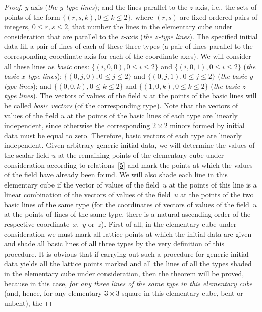 \begin{proof}
$y$-axis ({\it the $y$-type lines}); and the lines parallel to the
$z$-axis, i.e., the sets of points of the form $\{(r, s, k), 0 \leq
k \leq 2\}$, where $(r, s)$ are f\/ixed ordered pairs of integers, $0
\leq r, s \leq 2$, that number the lines in the elementary cube
under consideration that are parallel to the $z$-axis ({\it the
$z$-type lines}). The specif\/ied initial data f\/ill a pair of lines of
each of these three types (a pair of lines parallel to the
corresponding coordinate axis for each of the coordinate axes). We
will consider all these lines as {\it basic} ones: $\{(i, 0, 0), 0
\leq i \leq 2\}$ and $\{(i, 0, 1), 0 \leq i \leq 2\}$ ({\it the
basic $x$-type lines}); $\{(0, j, 0), 0 \leq j \leq 2\}$ and $\{(0,
j, 1), 0 \leq j \leq 2\}$ ({\it the basic $y$-type lines}); and
$\{(0, 0, k), 0 \leq k \leq 2\}$ and $\{(1, 0, k), 0 \leq k \leq
2\}$ ({\it the basic $z$-type lines}). The vectors of values of the
f\/ield $u$ at the points of the basic lines will be called {\it basic
vectors} (of the corresponding type). Note that the vectors of
values of the f\/ield $u$ at the points of the basic lines of each
type are linearly independent, since otherwise the corresponding $2
\times 2$ minors formed by initial data must be equal to zero.
Therefore, basic vectors of each type are linearly independent.
Given arbitrary generic initial data, we will determine the values
of the scalar f\/ield $u$ at the remaining points of the elementary
cube under consideration according to relations~\eqref{5} and mark
the points at which the values of the f\/ield have already been found.
We will also shade each line in this elementary cube if the vector
of values of the f\/ield~$u$ at the points of this line is a linear
combination of the vectors of values of the f\/ield~$u$ at the points
of the two basic lines of the same type (for the coordinates of
vectors of values of the f\/ield~$u$ at the points of lines of the
same type, there is a natural ascending order of the respective
coordinate~$x$,~$y$ or~$z$). First of all, in the elementary cube
under consideration we must mark all lattice points at which the
initial data are given and shade all basic lines of all three types
by the very def\/inition of this procedure. It is obvious that if
carrying out such a procedure for generic initial data yields all
the lattice points marked and all the lines of all the types shaded
in the elementary cube under consideration, then the theorem will be
proved, because in this case, {\it for any three lines of the same
type in this elementary cube} (and, hence, for any elementary $3
\times 3$ square in this elementary cube, bent or unbent), the

\end{proof}
